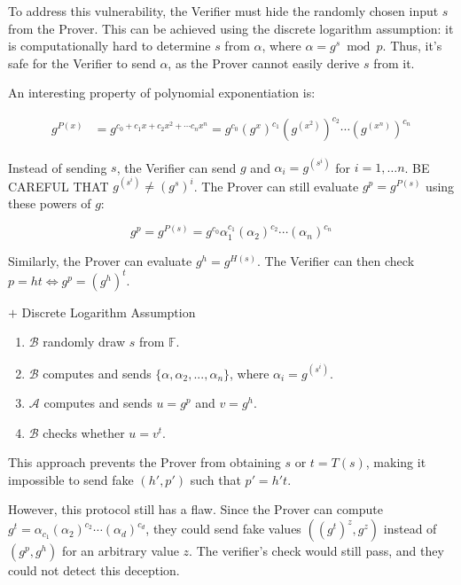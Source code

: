 \documentclass{article}
\begin{document}
To address this vulnerability, the Verifier must hide the randomly chosen input $s$ from the Prover. This can be achieved using the discrete logarithm assumption: it is computationally hard to determine $s$ from $\alpha$, where $\alpha = g^s \bmod p$. Thus, it's safe for the Verifier to send $\alpha$, as the Prover cannot easily derive $s$ from it.

An interesting property of polynomial exponentiation is:

\begin{align}
    g^{P(x)} &= g^{c_0 + c_1 x + c_2 x^{2} + \cdots c_n x^{n}} = g^{c_0} (g^{x})^{c_1}  (g^{(x^2)})^{c_2} \cdots (g^{(x^n)})^{c_n}
\end{align}

Instead of sending $s$, the Verifier can send $g$ and $\alpha_{i} = g^{(s^i)}$ for $i = 1, \hdots n$. BE CAREFUL THAT $g^{(s^i)} \bm{\neq} (g^s)^i$. The Prover can still evaluate $g^p = g^{P(s)}$ using these powers of $g$:

\begin{equation}
    g^{p} = g^{P(s)} = g^{c_0} \alpha_{1}^{c_1} (\alpha_{2})^{c_2} \cdots (\alpha_{n})^{c_n}
\end{equation}

Similarly, the Prover can evaluate $g^h = g^{H(s)}$. The Verifier can then check $p = ht \iff g^p = (g^h)^t$. 

\begin{protocol}{$+$ Discrete Logarithm Assumption}{}
\begin{enumerate}
    \item $\mathcal{B}$ randomly draw $s$ from $\mathbb{F}$.
    \item $\mathcal{B}$ computes and sends $\{\alpha, \alpha_2, ..., \alpha_{n}\}$, where $\alpha_i= g^{(s^{i})}$.
    \item $\mathcal{A}$ computes and sends $u = g^{p}$ and $v = g^{h}$.
    \item $\mathcal{B}$ checks whether $u = v^{t}$.
\end{enumerate}
\end{protocol}

This approach prevents the Prover from obtaining $s$ or $t = T(s)$, making it impossible to send fake $(h', p')$ such that $p' = h't$.

However, this protocol still has a flaw. Since the Prover can compute $g^t = \alpha_{c_1}(\alpha_2)^{c_2}\cdots(\alpha_d)^{c_d}$, they could send fake values $((g^{t})^{z}, g^{z})$ instead of $(g^p, g^h)$ for an arbitrary value $z$. The verifier's check would still pass, and they could not detect this deception.
\end{document}
